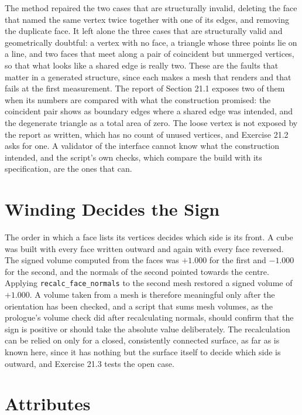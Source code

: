The method repaired the two cases that are structurally invalid, deleting the face that named the same vertex twice together with one of its edges, and removing the duplicate face. It left alone the three cases that are structurally valid and geometrically doubtful: a vertex with no face, a triangle whose three points lie on a line, and two faces that meet along a pair of coincident but unmerged vertices, so that what looks like a shared edge is really two. These are the faults that matter in a generated structure, since each makes a mesh that renders and that fails at the first measurement. The report of Section 21.1 exposes two of them when its numbers are compared with what the construction promised: the coincident pair shows as boundary edges where a shared edge was intended, and the degenerate triangle as a total area of zero. The loose vertex is not exposed by the report as written, which has no count of unused vertices, and Exercise 21.2 asks for one. A validator of the interface cannot know what the construction intended, and the script's own checks, which compare the build with its specification, are the ones that can.

\section{Winding Decides the Sign}

The order in which a face lists its vertices decides which side is its front. A cube was built with every face written outward and again with every face reversed. The signed volume computed from the faces was $+1.000$ for the first and $-1.000$ for the second, and the normals of the second pointed towards the centre. Applying \texttt{recalc\_face\_normals} to the second mesh restored a signed volume of $+1.000$. A volume taken from a mesh is therefore meaningful only after the orientation has been checked, and a script that sums mesh volumes, as the prologue's volume check did after recalculating normals, should confirm that the sign is positive or should take the absolute value deliberately. The recalculation can be relied on only for a closed, consistently connected surface, as far as is known here, since it has nothing but the surface itself to decide which side is outward, and Exercise 21.3 tests the open case.

\section{Attributes}

